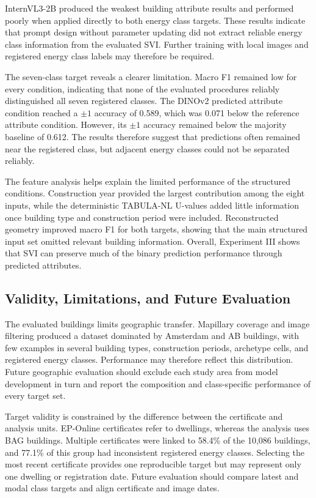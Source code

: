  InternVL3-2B produced the weakest building attribute results and performed poorly when applied directly to both energy class targets. These results indicate that prompt design without parameter updating did not extract reliable energy class information from the evaluated \Ac{SVI}. Further training with local images and registered energy class labels may therefore be required.

The seven-class target reveals a clearer limitation. Macro F1 remained low for every condition, indicating that none of the evaluated procedures reliably distinguished all seven registered classes. The DINOv2 predicted attribute condition reached a $\pm1$ accuracy of 0.589, which was 0.071 below the reference attribute condition. However, its $\pm1$ accuracy remained below the majority baseline of 0.612. The results therefore suggest that predictions often remained near the registered class, but adjacent energy classes could not be separated reliably.

The feature analysis helps explain the limited performance of the structured conditions. Construction year provided the largest contribution among the eight inputs, while the deterministic TABULA-NL U-values added little information once building type and construction period were included. Reconstructed geometry improved macro F1 for both targets, showing that the main structured input set omitted relevant building information. Overall, Experiment III shows that \Ac{SVI} can preserve much of the binary prediction performance through predicted attributes. 

\subsection{Validity, Limitations, and Future Evaluation}
\label{sec:validity_limitations}

The evaluated buildings limits geographic transfer. Mapillary coverage and image filtering produced a dataset dominated by Amsterdam and AB buildings, with few examples in several building types, construction periods, archetype cells, and registered energy classes. Performance may therefore reflect this distribution. Future geographic evaluation should exclude each study area from model development in turn and report the composition and class-specific performance of every target set. 

Target validity is constrained by the difference between the certificate and analysis units. EP-Online certificates refer to dwellings, whereas the analysis uses BAG buildings. Multiple certificates were linked to 58.4\% of the 10,086 buildings, and 77.1\% of this group had inconsistent registered energy classes. Selecting the most recent certificate provides one reproducible target but may represent only one dwelling or registration date. Future evaluation should compare latest and modal class targets and align certificate and image dates.

